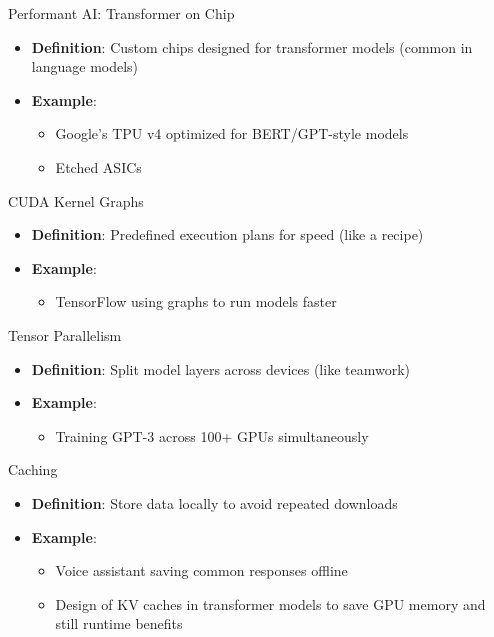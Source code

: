 \documentclass{beamer}
\begin{document}



\begin{frame}{Performant AI: Transformer on Chip}
\begin{itemize}
\item \textbf{Definition}: Custom chips designed for transformer models (common in language models)
\item \textbf{Example}: 
  \begin{itemize}
  \item Google’s TPU v4 optimized for BERT/GPT-style models
  \item Etched ASICs
  \end{itemize}
\end{itemize}

\end{frame}

\begin{frame}{CUDA Kernel Graphs}
\begin{itemize}
\item \textbf{Definition}: Predefined execution plans for speed (like a recipe)
\item \textbf{Example}: 
  \begin{itemize}
  \item TensorFlow using graphs to run models faster
  \end{itemize}
\end{itemize}
\end{frame}

\begin{frame}{Tensor Parallelism}
\begin{itemize}
\item \textbf{Definition}: Split model layers across devices (like teamwork)
\item \textbf{Example}: 
  \begin{itemize}
  \item Training GPT-3 across 100+ GPUs simultaneously
  \end{itemize}
\end{itemize}
\end{frame}

\begin{frame}{Caching}
\begin{itemize}
\item \textbf{Definition}: Store data locally to avoid repeated downloads
\item \textbf{Example}: 
  \begin{itemize}
  \item Voice assistant saving common responses offline
  \item Design of KV caches in transformer models to save GPU memory and still runtime benefits
  \end{itemize}
\end{itemize}
\end{frame}
\end{document}
